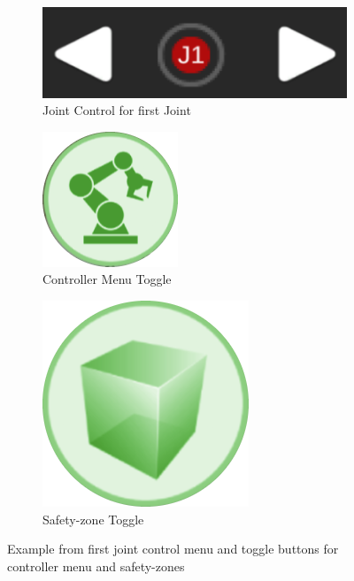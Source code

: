 \begin{figure}[h]
\centering
\begin{subfigure}[b]{0.31\textwidth}    
    \centering
    \includegraphics[width=1\linewidth]{figs/joint-1.png}
    \caption{Joint Control for first Joint}
    \label{fig:joint-1}
    \end{subfigure}
\hfill %
\begin{subfigure}[b]{0.31\textwidth}
    \centering
    \includegraphics[width=0.3\linewidth]{figs/clicked_joints.png}
    \caption{Controller Menu Toggle}
    \label{fig:toggle-joint}
\end{subfigure}
\hfill
\begin{subfigure}[b]{0.31\textwidth}
    \centering
    \includegraphics[width=0.3\linewidth]{figs/unclick_sz.png}
    \caption{Safety-zone Toggle}
    \label{fig:toggle-safety}
\end{subfigure}
\caption{Example from first joint control menu and toggle buttons for controller menu and safety-zones}
\label{fig:joint-toggle}
\end{figure}



